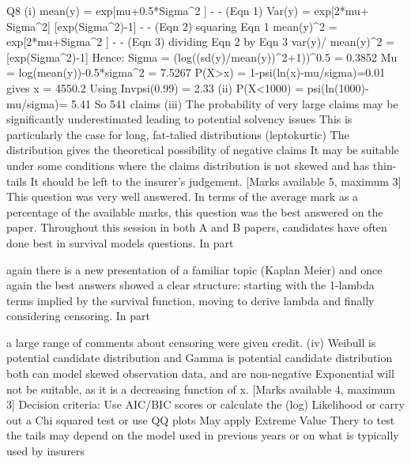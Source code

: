 \documentclass[a4paper,12pt]{article}
\begin{document}
Q8
(i)
mean(y) = exp[mu+0.5*Sigma^2 ] - - (Eqn 1) 
Var(y) = exp[2*mu+ Sigma^2] [exp(Sigma^2)-1] - - (Eqn 2) 
squaring Eqn 1
mean(y)^2 = exp[2*mu+Sigma^2 ] - - (Eqn 3) 
dividing Eqn 2 by Eqn 3
var(y)/ mean(y)^2 = [exp(Sigma^2)-1] 
Hence:
Sigma = (log((sd(y)/mean(y))^2+1))^0.5 = 0.3852 
Mu = log(mean(y))-0.5*sigma^2 = 7.5267 
P(X>x) = 1-psi(ln(x)-mu/sigma)=0.01 gives x = 4550.2 
Using Invpsi(0.99) = 2.33 
(ii)
P(X<1000) = psi(ln(1000)-mu/sigma)= 5.41%
So 541 claims 
(iii)
The probability of very large claims may be significantly underestimated 
leading to potential solvency issues 
This is particularly the case for long, fat-talied distributions (leptokurtic) 
The distribution gives the theoretical possibility of negative claims 
It may be suitable under some conditions 
where the claims distribution is not skewed 
and has thin-tails 
It should be left to the insurer’s judgement.  [Marks available 5, maximum 3]
This question was very well answered. In terms of the average mark as a percentage of the available marks, this question was the best answered on the paper. Throughout this session in both A and B papers, candidates have often done best in survival models questions.
In part \item again there is a new presentation of a familiar topic (Kaplan Meier) and once again the best answers showed a clear structure: starting with the 1-lambda terms implied by the survival function, moving to derive lambda and finally considering censoring.
In part \item a large range of comments about censoring were given credit.
\newline
(iv)
Weibull is potential candidate distribution 
and Gamma is potential candidate distribution 
both can model skewed observation data, 
and are non-negative 
Exponential will not be suitable, 
as it is a decreasing function of x.  [Marks available 4, maximum 3]
Decision criteria:
Use AIC/BIC scores 
or calculate the (log) Likelihood 
or carry out a Chi squared test 
or use QQ plots 
May apply Extreme Value Thery to test the tails 
may depend on the model used in previous years 
or on what is typically used by insurers 


\end{document}

